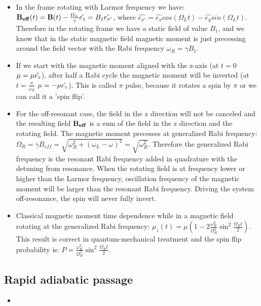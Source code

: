\documentclass[AtomicOptical1Notes.tex]{subfiles}
\begin{document}
\begin{itemize}
			\item In the frame rotating with Larmor frequency we have: $ \mathbf{B_{eff}}(t) = \mathbf{B}(t) - \frac{\Omega_L}{\gamma}\hat{e_z} = B_1\hat{e_{x'}} $, where $ \hat{e_{x'}} = \hat{e_x}cos(\Omega_L t) - \hat{e_y}sin(\Omega_L t) $. Therefore in the rotating frame we have a static field of value $ B_1 $, and we know that in the static magnetic field magnetic moment is just precessing around the field vector with the Rabi frequency $ \omega_R = \gamma B_1 $.
			\item If we start with the magnetic moment aligned with the z-axis (at $t=0$ $\mathbf{\mu}=\mu\hat{e_z}$), after half a Rabi cycle the magnetic moment will be inverted (at $t=\frac{\pi}{\omega_R}$ $\mathbf{\mu}=-\mu\hat{e_z}$). This is called $\pi$ pulse, because it rotates a spin by $\pi$ or we can call it a 'spin flip'.
			\item For the off-resonant case, the field in the z direction will not be canceled and the resulting field $\mathbf{B_{eff}}$ is a sum of the field in the z direction and the rotating field. The magnetic moment precesses at generalized Rabi frequency: $ \Omega_R = \gamma B_{eff} = \sqrt{\omega_R^2+(\omega_L-\omega)^2} = \sqrt{\omega_R^2} $. Therefore the generalized Rabi frequency is the resonant Rabi frequency added in quadrature with the detuning from resonance. When the rotating field is at frequency lower or higher than the Larmor frequency, oscillation frequency of the magnetic moment will be larger than the resonant Rabi frequency. Driving the system off-resonance, the spin will never fully invert.
			\item Classical magnetic moment time dependence while in a magnetic field rotating at the generalized Rabi frequency: $ \mu_z(t) = \mu \left( 1 - 2 \frac{\omega_R^2}{\Omega_R^2} \sin^2 \frac{\Omega_R t}{2} \right) $. This result is correct in quantum-mechanical treatment and the spin flip probability is: $ P= \frac{\omega_R^2}{\Omega_R^2} \sin^2 \frac{\Omega_R t}{2} $.
		\end{itemize}
		
	\subsection{Rapid adiabatic passage}
		\begin{itemize}
			\item 
		\end{itemize}
\end{document}
